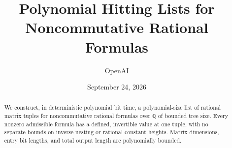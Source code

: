 \documentclass[11pt]{article}
\title{Polynomial Hitting Lists for Noncommutative Rational Formulas}
\author{OpenAI}
\date{September 24, 2026}
\theoremstyle{definition}
\theoremstyle{remark}
\newcommand{\Q}{\mathbb Q}
\numberwithin{equation}{section}
\begin{document}
\maketitle
\begin{abstract}
We construct, in deterministic polynomial bit time, a polynomial-size list of rational matrix tuples for noncommutative rational formulas over $\Q$ of bounded tree size. Every nonzero admissible formula has a defined, invertible value at one tuple, with no separate bounds on inverse nesting or rational constant heights. Matrix dimensions, entry bit lengths, and total output length are polynomially bounded.
\end{abstract}








\end{document}
